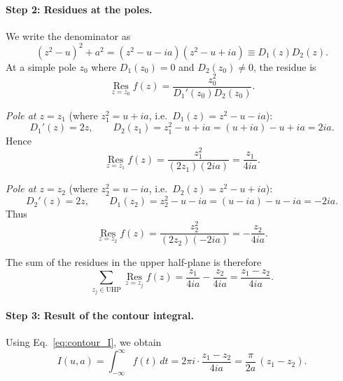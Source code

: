 \paragraph{Step 2: Residues at the poles.}

We write the denominator as
\[
(z^2-u)^2 + a^2 = (z^2-u-ia)(z^2-u+ia)
\equiv D_1(z)D_2(z).
\]
At a simple pole $z_0$ where $D_1(z_0)=0$ and $D_2(z_0)\neq 0$, the residue is
\[
\operatorname*{Res}_{z=z_0} f(z)
=
\frac{z_0^2}{D_1'(z_0)D_2(z_0)}.
\]

\emph{Pole at $z=z_1$} (where $z_1^2 = u+ia$, i.e.\ $D_1(z) = z^2-u-ia$):
\begin{equation}
D_1'(z) = 2z, \qquad
D_2(z_1) = z_1^2 - u + ia = (u+ia) - u + ia = 2ia.
\end{equation}
Hence
\begin{equation}
\operatorname*{Res}_{z=z_1} f(z)
=
\frac{z_1^2}{(2z_1)(2ia)}
=
\frac{z_1}{4ia}.
\end{equation}

\emph{Pole at $z=z_2$} (where $z_2^2 = u-ia$, i.e.\ $D_2(z) = z^2-u+ia$):
\begin{equation}
D_2'(z) = 2z, \qquad
D_1(z_2) = z_2^2 - u - ia = (u-ia) - u - ia = -2ia.
\end{equation}
Thus
\begin{equation}
\operatorname*{Res}_{z=z_2} f(z)
=
\frac{z_2^2}{(2z_2)(-2ia)}
=
-\frac{z_2}{4ia}.
\end{equation}

The sum of the residues in the upper half-plane is therefore
\begin{equation}
\sum_{z_j\in\text{UHP}} \operatorname*{Res}_{z=z_j} f(z)
=
\frac{z_1}{4ia} - \frac{z_2}{4ia}
=
\frac{z_1 - z_2}{4ia}.
\end{equation}

\paragraph{Step 3: Result of the contour integral.}

Using Eq.~\eqref{eq:contour_I}, we obtain
\begin{equation}
I(u,a)
=
\int_{-\infty}^{\infty} f(t)\,dt
=
2\pi i \cdot \frac{z_1 - z_2}{4ia}
=
\frac{\pi}{2a}\,(z_1 - z_2).
\label{eq:I_z1z2}
\end{equation}

